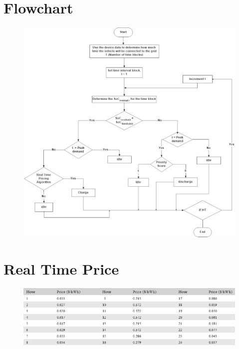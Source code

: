 	\section{Flowchart}
	
	\begin{figure}
		\centering
		\includegraphics[width=0.9\linewidth]{Figures/Ev_flowchart}
		\caption{}
		\label{fig:evflowchart}
	\end{figure}


	\section{Real Time Price}
	
		\begin{figure}[!h]
			\centering
			\includegraphics[width=0.7\linewidth]{Figures/rtp}
			\caption{}
			\label{fig:rtp}
		\end{figure}
	
	